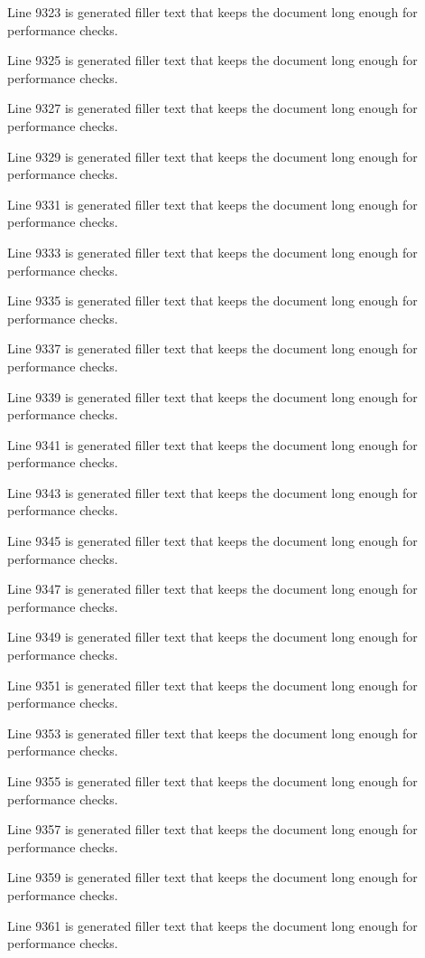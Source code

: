 Line 9323 is generated filler text that keeps the document long enough for performance checks.

Line 9325 is generated filler text that keeps the document long enough for performance checks.

Line 9327 is generated filler text that keeps the document long enough for performance checks.

Line 9329 is generated filler text that keeps the document long enough for performance checks.

Line 9331 is generated filler text that keeps the document long enough for performance checks.

Line 9333 is generated filler text that keeps the document long enough for performance checks.

Line 9335 is generated filler text that keeps the document long enough for performance checks.

Line 9337 is generated filler text that keeps the document long enough for performance checks.

Line 9339 is generated filler text that keeps the document long enough for performance checks.

Line 9341 is generated filler text that keeps the document long enough for performance checks.

Line 9343 is generated filler text that keeps the document long enough for performance checks.

Line 9345 is generated filler text that keeps the document long enough for performance checks.

Line 9347 is generated filler text that keeps the document long enough for performance checks.

Line 9349 is generated filler text that keeps the document long enough for performance checks.

Line 9351 is generated filler text that keeps the document long enough for performance checks.

Line 9353 is generated filler text that keeps the document long enough for performance checks.

Line 9355 is generated filler text that keeps the document long enough for performance checks.

Line 9357 is generated filler text that keeps the document long enough for performance checks.

Line 9359 is generated filler text that keeps the document long enough for performance checks.

Line 9361 is generated filler text that keeps the document long enough for performance checks.

